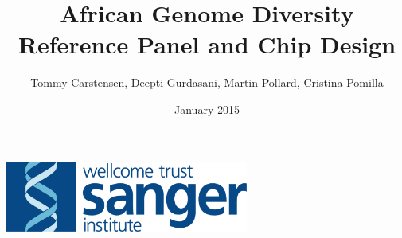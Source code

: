 \documentclass{article}
\title{African Genome Diversity Reference Panel and Chip Design}
\author{Tommy Carstensen, Deepti Gurdasani, Martin Pollard, Cristina Pomilla}
\date{January 2015}
\begin{document}
\maketitle
\centerline{\includegraphics[width=80mm]{sang_logo_large}}





%








\end{document}
